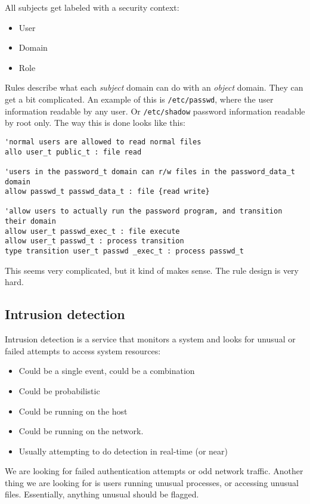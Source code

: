 \documentclass[11pt,a4paper,titlepage,dvipsnames,cmyk]{scrartcl}
\begin{document}
All subjects get labeled with a security context:
\begin{itemize}
    \item User
    \item Domain
    \item Role
\end{itemize}

Rules describe what each \textit{subject} domain can do with an \textit{object} domain. They can get a bit complicated. An example of this is \texttt{/etc/passwd}, where the user information readable by any user. Or \texttt{/etc/shadow} password information readable by root only. The way this is done looks like this:
\begin{lstlisting}
'normal users are allowed to read normal files
allo user_t public_t : file read

'users in the password_t domain can r/w files in the password_data_t domain
allow passwd_t passwd_data_t : file {read write}

'allow users to actually run the password program, and transition their domain
allow user_t passwd_exec_t : file execute
allow user_t passwd_t : process transition
type transition user_t passwd _exec_t : process passwd_t
\end{lstlisting}

This seems very complicated, but it kind of makes sense. The rule design is very hard.

\subsection{Intrusion detection}
Intrusion detection is a service that monitors a system and looks for unusual or failed attempts to access system resources:
\begin{itemize}
    \item Could be a single event, could be a combination
    \item Could be probabilistic
    \item Could be running on the host
    \item Could be running on the network.
    \item Usually attempting to do detection in real-time (or near)
\end{itemize}

We are looking for failed authentication attempts or odd network traffic. Another thing we are looking for is users running unusual processes, or accessing unusual files. Essentially, anything unusual should be flagged.
\end{document}
